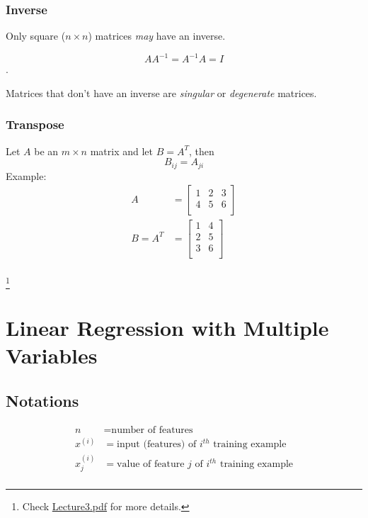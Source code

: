 \documentclass[a4paper, 12pt]{report}
\newcommand\blfootnote[1]{
	\begingroup
	\renewcommand\thefootnote{}\footnote{#1}
	\addtocounter{footnote}{-1}
	\endgroup
}
\begin{document}
\subsection*{Inverse}
Only square ($n \times n$) matrices \emph{may} have an inverse.

$$AA^{-1} = A^{-1}A = I$$.

Matrices that don't have an inverse	are \emph{singular} or \emph{degenerate} matrices.

\subsection*{Transpose}
Let $A$ be an $m \times n$ matrix and let $B = A^T$, then
$$ B_{ij} = A_{ji} $$
Example:
\begin{align*}
	A       & =	\begin{bmatrix}
		1 & 2 & 3 \\
		4 & 5 & 6 \\
	\end{bmatrix} \\
	B = A^T & =	\begin{bmatrix}
		1 & 4 \\
		2 & 5 \\
		3 & 6 \\
	\end{bmatrix} \\
\end{align*}

\blfootnote{Check \href{lecture_pdf/Lecture3.pdf}{Lecture3.pdf} for more details.}

\chapter{Linear Regression with Multiple Variables}

\section{Notations}
\begin{align*}
	n         & = \text{number of features}                                \\
	x^{(i)}   & = \text{input (features) of $i^{th}$ training example}     \\
	x_j^{(i)} & = \text{value of feature $j$ of $i^{th}$ training example} \\
\end{align*}
\end{document}
